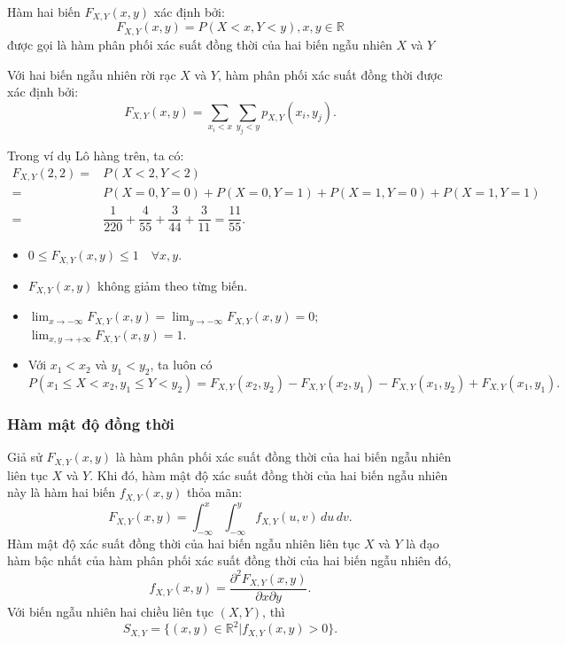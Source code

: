 \documentclass[12pt,a4paper]{article}
\begin{document}
\begin{dinhnghia}[title={Hàm phân phối xác suất đồng thời}]
  Hàm hai biến $F_{X,Y}(x, y)$ xác định bởi:
  \[
    F_{X,Y}(x, y) = P(X < x, Y < y), x, y \in \mathbb{R}
  \]
  được gọi là hàm phân phối xác suất đồng thời của hai biến ngẫu nhiên $X$ và $Y$

  Với hai biến ngẫu nhiên rời rạc $X$ và $Y$, hàm phân phối xác suất đồng thời được xác định bởi:
  \[
    F_{X,Y}(x, y) = \displaystyle\sum_{x_i < x} \displaystyle\sum_{y_j < y} p_{X,Y}(x_i, y_j).
  \]
\end{dinhnghia}

\begin{vidu}
Trong ví dụ Lô hàng trên, ta có:
  \begin{align*}
    F_{X,Y}(2, 2) = & P(X < 2, Y < 2) \\
    = & P(X = 0, Y = 0) + P(X = 0, Y = 1) + P(X = 1, Y = 0) + P(X = 1, Y = 1) \\
    = & \dfrac{1}{220} + \dfrac{4}{55} + \dfrac{3}{44} + \dfrac{3}{11} = \dfrac{11}{55}.
  \end{align*}
\end{vidu}

\begin{tinhchat}[title={Tính chất}]
  \begin{itemize}
    \item $0 \le F_{X,Y}(x, y) \le 1 \quad \forall x, y$.
    \item $F_{X,Y}(x, y)$ không giảm theo từng biến.
    \item $\displaystyle\lim_{x \to -\infty} F_{X,Y}(x, y) = \lim_{y \to -\infty} F_{X,Y}(x, y) = 0$; $\displaystyle\lim_{x, y \to +\infty} F_{X,Y}(x, y) = 1$.
    \item Với $x_1 < x_2$ và $y_1 < y_2$, ta luôn có
    \[
      P(x_1 \le X < x_2, y_1 \le Y < y_2) = F_{X,Y}(x_2, y_2) - F_{X,Y}(x_2, y_1) - F_{X,Y}(x_1, y_2) + F_{X,Y}(x_1, y_1).
    \]
  \end{itemize}
\end{tinhchat}

\subsubsection{Hàm mật độ đồng thời}

\begin{dinhnghia}[title={Hàm mật độ xác suất đồng thời}]
  Giả sử $F_{X,Y}(x, y)$ là hàm phân phối xác suất đồng thời của hai biến ngẫu nhiên liên tục $X$ và $Y$. Khi đó, hàm mật độ xác suất đồng thời của hai biến ngẫu nhiên này là hàm hai biến $f_{X,Y}(x, y)$ thỏa mãn:
  \[
    F_{X,Y}(x, y) = \displaystyle\int_{-\infty}^{x} \displaystyle\int_{-\infty}^{y} f_{X,Y}(u, v)\,du\,dv.
  \]
  Hàm mật độ xác suất đồng thời của hai biến ngẫu nhiên liên tục $X$ và $Y$ là đạo hàm bậc nhất của hàm phân phối xác suất đồng thời của hai biến ngẫu nhiên đó,
  \[
    f_{X,Y}(x, y) = \dfrac{\partial^2 F_{X,Y}(x, y)}{\partial x \partial y}.
  \]
  Với biến ngẫu nhiên hai chiều liên tục $(X, Y)$, thì
  \[
    S_{X,Y} = \{(x, y) \in \mathbb{R}^2 | f_{X,Y}(x, y) > 0\}.
  \]
\end{dinhnghia}
\end{document}
